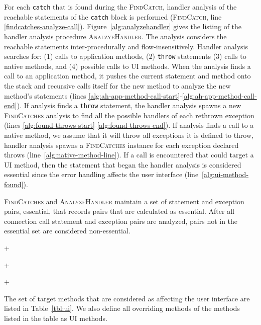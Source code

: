 For each \lstinline!catch! that is found during the
\textsc{FindCatch}, handler analysis of the reachable statements of
the \lstinline!catch! block is performed (\textsc{FindCatch}, line
\ref{findcatches-analyze-call}).  Figure~\ref{alg:analyzehandler}
gives the listing of the handler analysis procedure
\textsc{AnalzyeHandler}. The analysis considers the reachable
statements inter-procedurally and flow-insens\-itively.  Handler
analysis searches for: (1) calls to application methods, (2)
\lstinline!throw! statements (3) calls to native methods, and (4)
possible calls to UI methods. When the analysis finds a call to an
application method, it pushes the current statement and method onto
the stack and recursive calls itself for the new method to analyze the
new method's statements (lines
\ref{alg:ah-app-method-call-start}-\ref{alg:ah-app-method-call-end}).
If analysis finds a \lstinline!throw!  statement, the handler analysis
spawns a new \textsc{FindCatches} analysis to find all the
possible handlers of each rethrown exception (lines
\ref{alg:found-throws-start}-\ref{alg:found-throws-end}).  If analysis
finds a call to a native method, we assume that it will throw all
exceptions it is defined to throw, handler analysis spawns a
\textsc{FindCatches} instance for each exception declared throws
(line~\ref{alg:native-method-line}).  If a call is encountered that
could target a UI method, then the statement that began the handler
analysis is considered essential since the error handling affects the
user interface (line~\ref{alg:ui-method-found}).

\textsc{FindCatches} and \textsc{AnalyzeHandler} maintain a set of
statement and exception pairs, essential, that records pairs that are
calculated as essential.  After all connection call statement and
exception pairs are analyzed, pairs not in the essential set are
considered non-essential.

\lstDeleteShortInline+

\lstMakeShortInline[basicstyle=\scriptsize\ttfamily,keywordstyle=\color{DarkPurple},breaklines=true]+



\lstDeleteShortInline+



The set of target methods that are considered as affecting the user
interface are listed in Table~\ref{tbl:ui}.  We also define all
overriding methods of the methods listed in the table as UI methods.

